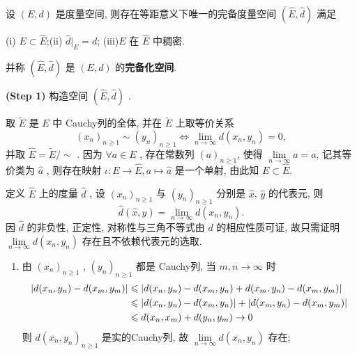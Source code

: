 	\begin{Theorem}[度量空间的完备化]
		 设 $ (E, d) $ 是度量空间, 则存在等距意义下唯一的完备度量空间 $ (\widehat{E}, \hat{d}) $ 满足

		 (i) $ E\subset \widehat{E} $;\hspace{6em}(ii) $ \hat{d}|_{E}=d $;\hspace{6em}  (iii)$ E $ 在 $ \widehat{E} $ 中稠密.

		 \noindent 并称 $ (\widehat{E}, \hat{d}) $ 是 $ (E, d) $ 的\textbf{完备化空间}.
	\end{Theorem}
	\begin{Proof}

		\textbf{(Step 1)} 构造空间 $ (\widehat{E}, \hat{d}) $ .

		取 $ \widetilde{E} $ 是 $ E $ 中 Cauchy列的全体, 并在 $ \widetilde{E} $ 上取等价关系
		\[
			(x_{n})_{n\geqslant1}\sim (y_{n})_{n\geqslant1}\Longleftrightarrow \lim_{n\to\infty}d(x_{n},y_{n})=0,
		\]
		并取 $ \widehat{E}=\widetilde{E}/\sim $ . 因为 $ \forall a\in E $ , 存在常数列  $ (a)_{n\geqslant1} $, 使得 $ \lim\limits_{n\to\infty}a=a $, 记其等价类为 $ \hat{a} $ , 则存在映射 $ \iota :E\to\widehat{E}, a\mapsto \hat{a} $ 是一个单射, 由此知 $ E\subset\widehat{E} $.

		定义 $ \widehat{E} $ 上的度量 $ \hat{d} $ , 设 $ (x_{n})_{n\geqslant1} $ 与 $ (y_{n})_{n\geqslant1} $ 分别是 $ \hat{x} $, $ \hat{y} $ 的代表元, 则
		\[
			\hat{d}(\hat{x}, \hat{y})=\lim_{n\to\infty}d(x_{n},y_{n}).
		\]
		因 $ \hat{d} $ 的非负性, 正定性, 对称性与三角不等式由 $ d $ 的相应性质可证, 故只需证明 $ \lim\limits_{n\to\infty}d(x_{n}, y_{n}) $ 存在且不依赖代表元的选取.

		\begin{enumerate}[(1)]

			\item 由 $ (x_{n})_{n\geqslant1} $ , $ (y_{n})_{n\geqslant1} $ 都是 Cauchy列, 当 $ m, n\to\infty $ 时
			\[
				\begin{aligned}
					\left| d(x_{n}, y_{n})-d(x_{m}, y_{m}) \right|  & \leqslant \left| d(x_{n}, y_{n})-d(x_{m}, y_{n})+ d(x_{m}, y_{n})-d(x_{m}, y_{m}) \right| \\
					& \leqslant \left| d(x_{n}, y_{n})-d(x_{m}, y_{n}) \right| +\left| d(x_{m}, y_{n})-d(x_{m}, y_{m}) \right| \\
					& \leqslant d(x_{n}, x_{m})+d(y_{n}, y_{m})\to 0
				\end{aligned}
			\]
			则 $ d(x_{n}, y_{n})_{n\geqslant1} $ 是实的Cauchy列,  故 $ \lim\limits_{n\to\infty}d(x_{n}, y_{n}) $ 存在;


\end{enumerate}
\end{Proof}
